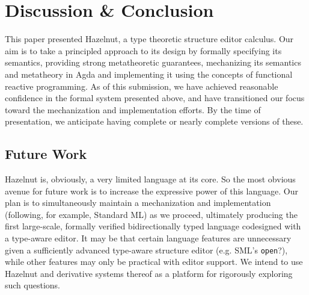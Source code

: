 \documentclass{llncs}
\begin{document}
%
%



\section{Discussion \& Conclusion}
\label{sec:future}
This paper presented Hazelnut, a type theoretic structure editor calculus. Our aim is to take a principled approach to its design by formally specifying its semantics, providing strong metatheoretic guarantees, mechanizing its semantics and metatheory in Agda and implementing it using the concepts of  functional reactive programming. As of this submission, we have achieved reasonable confidence in the formal system presented above, and have transitioned our focus toward the mechanization and implementation efforts. By the time of presentation, we anticipate having complete or nearly complete versions of these.

\subsection{Future Work}
Hazelnut is, obviously, a very limited language at its core. So the most obvious avenue for future work is to increase the expressive power of this language. Our plan is to simultaneously maintain a mechanization and implementation (following, for example, Standard ML) as we proceed, ultimately producing the first large-scale, formally verified bidirectionally typed language codesigned with a type-aware editor. It may be that certain language features are unnecessary given a sufficiently advanced type-aware structure editor (e.g. SML's \texttt{open}?), while other features may only be practical with editor support. We intend to use Hazelnut and derivative systems thereof as a platform for rigorously exploring such questions.
\end{document}
